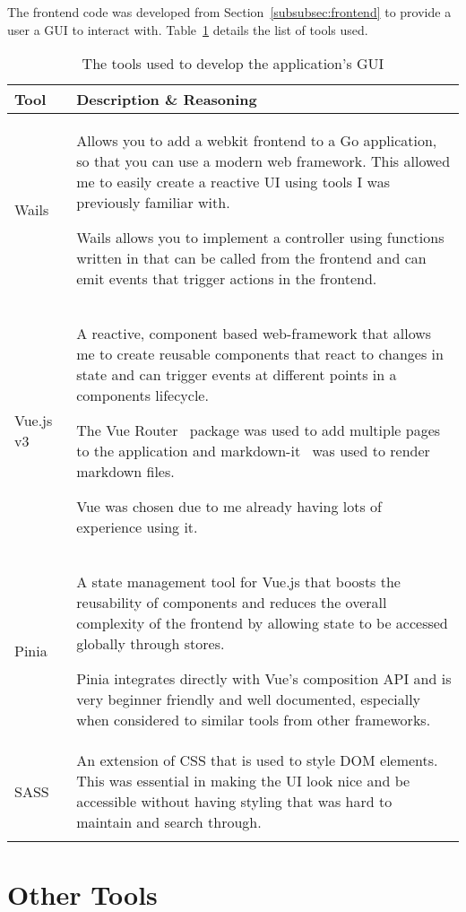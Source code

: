 The frontend code was developed from Section~\ref{subsubsec:frontend} to provide a user a GUI to interact with. Table~\ref{tab:tools-frontend} details the list of tools used.

\begin{longtable}{p{} p{}}
  \toprule
  \textbf{Tool} & \textbf{Description \& Reasoning}
  \\\midrule\midrule
  Wails~\cite{noauthor_wails_nodate}
  & \small Allows you to add a webkit frontend to a Go application, so that you can use a modern web framework. This allowed me to easily create a reactive UI using tools I was previously familiar with.

  Wails allows you to implement a controller using functions written in that can be called from the frontend and can emit events that trigger actions in the frontend.
  \\
  Vue.js v3~\cite{noauthor_vuejs_nodate}
  & \small A reactive, component based web-framework that allows me to create reusable components that react to changes in state and can trigger events at different points in a components lifecycle.
  
  The Vue Router~\cite{noauthor_vue_nodate} package was used to add multiple pages to the application and markdown-it~\cite{noauthor_markdown-it_2023} was used to render markdown files.

  Vue was chosen due to me already having lots of experience using it.
  \\
  Pinia~\cite{noauthor_pinia_nodate}
  & \small A state management tool for Vue.js that boosts the reusability of components and reduces the overall complexity of the frontend by allowing state to be accessed globally through stores.
  
  Pinia integrates directly with Vue's composition API and is very beginner friendly and well documented, especially when considered to similar tools from other frameworks.
  \\
  SASS~\cite{noauthor_sass_nodate}
  & \small An extension of CSS that is used to style DOM elements. This was essential in making the UI look nice and be accessible without having styling that was hard to maintain and search through.
  \\
  \bottomrule\bottomrule
  \caption{The tools used to develop the application's GUI }
  \label{tab:tools-frontend}
\end{longtable}

\section{Other Tools}

